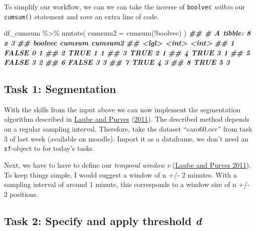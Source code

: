 \documentclass[
]{book}
\newenvironment{Shaded}{\begin{snugshade}}{\end{snugshade}}
\newcommand{\AttributeTok}[1]{\textcolor[rgb]{0.77,0.63,0.00}{#1}}
\newcommand{\DocumentationTok}[1]{\textcolor[rgb]{0.56,0.35,0.01}{\textbf{\textit{#1}}}}
\newcommand{\FunctionTok}[1]{\textcolor[rgb]{0.00,0.00,0.00}{#1}}
\newcommand{\NormalTok}[1]{#1}
\newcommand{\SpecialCharTok}[1]{\textcolor[rgb]{0.00,0.00,0.00}{#1}}
\begin{document}
To simplify our workflow, we can we can take the inverse of \texttt{boolvec} \emph{within} our \texttt{cumsum()} statement and save an extra line of code.

\begin{Shaded}
\begin{Highlighting}[]
\NormalTok{df\_cumsum }\SpecialCharTok{\%\textgreater{}\%}
  \FunctionTok{mutate}\NormalTok{(}
    \AttributeTok{cumsum2 =} \FunctionTok{cumsum}\NormalTok{(}\SpecialCharTok{!}\NormalTok{boolvec)}
\NormalTok{  )}
\DocumentationTok{\#\# \# A tibble: 8 x 3}
\DocumentationTok{\#\#   boolvec cumsum cumsum2}
\DocumentationTok{\#\#   \textless{}lgl\textgreater{}    \textless{}int\textgreater{}   \textless{}int\textgreater{}}
\DocumentationTok{\#\# 1 FALSE        0       1}
\DocumentationTok{\#\# 2 TRUE         1       1}
\DocumentationTok{\#\# 3 TRUE         2       1}
\DocumentationTok{\#\# 4 TRUE         3       1}
\DocumentationTok{\#\# 5 FALSE        3       2}
\DocumentationTok{\#\# 6 FALSE        3       3}
\DocumentationTok{\#\# 7 TRUE         4       3}
\DocumentationTok{\#\# 8 TRUE         5       3}
\end{Highlighting}
\end{Shaded}

\hypertarget{task-1-segmentation}{%
\subsection{Task 1: Segmentation}\label{task-1-segmentation}}

With the skills from the input above we can now implement the segmentation algorithm described in \protect\hyperlink{ref-laube2011}{Laube and Purves} (\protect\hyperlink{ref-laube2011}{2011}). The described method depends on a regular sampling interval. Therefore, take the dataset ``caro60.csv'' from task 3 of last week (available on moodle). Import it as a dataframe, we don't need an \texttt{sf}-object to for today's tasks.

Next, we have to have to define our \emph{temporal window v} (\protect\hyperlink{ref-laube2011}{Laube and Purves 2011}). To keep things simple, I would suggest a window of n +/- 2 minutes. With a sampling interval of around 1 minute, this corresponds to a window size of n +/- 2 positions.

\hypertarget{task-2-specify-and-apply-threshold-d}{%
\subsection{\texorpdfstring{Task 2: Specify and apply threshold \emph{d}}{Task 2: Specify and apply threshold d}}\label{task-2-specify-and-apply-threshold-d}}
\end{document}
